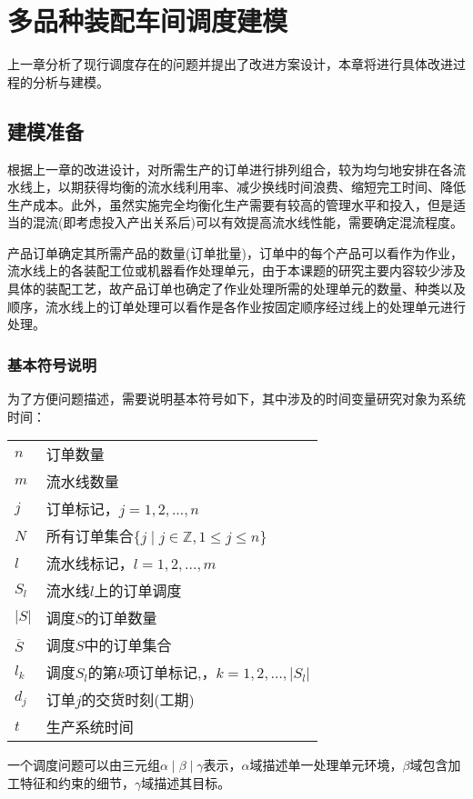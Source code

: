 \chapter{多品种装配车间调度建模}
上一章分析了现行调度存在的问题并提出了改进方案设计，本章将进行具体改进过程的分析与建模。

\section{建模准备}

根据上一章的改进设计，对所需生产的订单进行排列组合，较为均匀地安排在各流水线上，以期获得均衡的流水线利用率、减少换线时间浪费、缩短完工时间、降低生产成本。此外，虽然实施完全均衡化生产需要有较高的管理水平和投入，但是适当的混流(即考虑投入产出关系后)可以有效提高流水线性能，需要确定混流程度。

产品订单确定其所需产品的数量(订单批量)，订单中的每个产品可以看作为作业，流水线上的各装配工位或机器看作处理单元，由于本课题的研究主要内容较少涉及具体的装配工艺，故产品订单也确定了作业处理所需的处理单元的数量、种类以及顺序，流水线上的订单处理可以看作是各作业按固定顺序经过线上的处理单元进行处理。

\subsection{基本符号说明}
为了方便问题描述，需要说明基本符号如下，其中涉及的时间变量研究对象为系统时间：\\[3pt]
\begin{supertabular}{ll}
$n$ & 订单数量\\
$m$ & 流水线数量\\
$j$ & 订单标记，$j = 1,2,...,n$\\
$N$ & 所有订单集合$\{ j\mid j \in \mathbb{Z}, 1\le j \le n  \}$\\
$l$ & 流水线标记，$l = 1,2,...,m$\\
$S_l$ & 流水线$l$上的订单调度\\
$|S|$ & 调度$S$的订单数量\\
$\overline S$ & 调度$S$中的订单集合\\
$l_k$ & 调度$S_l$的第$k$项订单标记,，$k = 1,2,...,|S_l|$\\
$d_j$ & 订单$j$的交货时刻(工期)\\
$t$ & 生产系统时间\\[3pt]
\end{supertabular}

一个调度问题可以由三元组$\alpha \mid \beta \mid \gamma$表示，$\alpha$域描述单一处理单元环境，$\beta$域包含加工特征和约束的细节，$\gamma$域描述其目标\cite{pinedo}。

